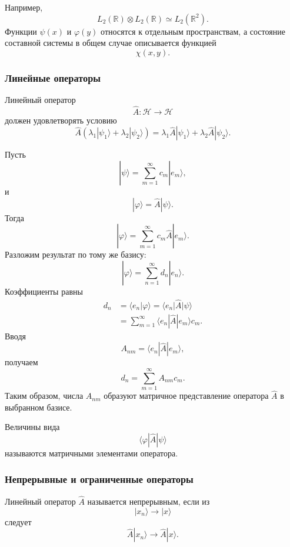 \documentclass[12pt,a4paper]{article}
\begin{document}
Например,
\[
    \boxed{
        L_2(\mathbb R)\otimes L_2(\mathbb R)
        \simeq
        L_2(\mathbb R^2)
    }.
\]
Функции $\psi(x)$ и $\varphi(y)$ относятся к отдельным пространствам,
а состояние составной системы в общем случае описывается функцией
\[
    \chi(x,y).
\]


\subsubsection{Линейные операторы}

Линейный оператор
\[
    \hat A:\mathcal H\to\mathcal H
\]
должен удовлетворять условию
\[
\boxed{
\hat A
\left(
    \lambda_1|\psi_1\rangle+
    \lambda_2|\psi_2\rangle
\right)
=
\lambda_1\hat A|\psi_1\rangle+
\lambda_2\hat A|\psi_2\rangle
}.
\]

Пусть
\[
    |\psi\rangle
    =
    \sum_{m=1}^{\infty}c_m|e_m\rangle,
\]
и
\[
    |\varphi\rangle
    =
    \hat A|\psi\rangle.
\]
Тогда
\[
    |\varphi\rangle
    =
    \sum_{m=1}^{\infty}
        c_m\hat A|e_m\rangle.
\]
Разложим результат по тому же базису:
\[
    |\varphi\rangle
    =
    \sum_{n=1}^{\infty}
        d_n|e_n\rangle.
\]
Коэффициенты равны
\[
\begin{aligned}
    d_n
    &=
    \langle e_n|\varphi\rangle
    =
    \langle e_n|\hat A|\psi\rangle \\
    &=
    \sum_{m=1}^{\infty}
    \langle e_n|\hat A|e_m\rangle c_m.
\end{aligned}
\]
Вводя
\[
    \boxed{
        A_{nm}
        =
        \langle e_n|\hat A|e_m\rangle
    },
\]
получаем
\[
    \boxed{
        d_n
        =
        \sum_{m=1}^{\infty}A_{nm}c_m
    }.
\]
Таким образом, числа $A_{nm}$ образуют матричное представление
оператора $\hat A$ в выбранном базисе.

Величины вида
\[
    \langle\varphi|\hat A|\psi\rangle
\]
называются матричными элементами оператора.

\subsubsection{Непрерывные и ограниченные операторы}

Линейный оператор $\hat A$ называется непрерывным, если из
\[
    |x_n\rangle\longrightarrow|x\rangle
\]
следует
\[
    \boxed{
        \hat A|x_n\rangle
        \longrightarrow
        \hat A|x\rangle
    }.
\]
\end{document}
